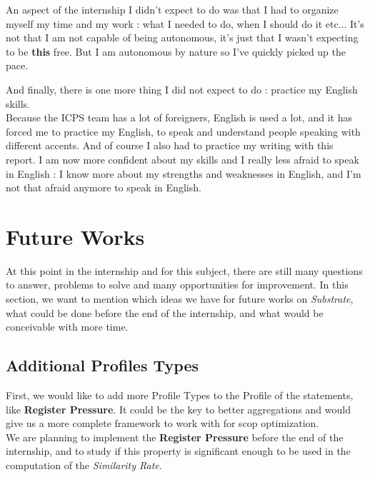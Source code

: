 \documentclass[paper=a4, fontsize=11.5pt]{scrartcl}
\numberwithin{equation}{section}        %
\numberwithin{figure}{section}          %
\numberwithin{table}{section}               %
\begin{document}
        An aspect of the internship I didn't expect to do was that I had to organize myself
        my time and my work : what I needed to do, when I should do it etc... It's not that I
        am not capable of being autonomous, it's just that I wasn't expecting to be
        \textbf{this} free. But I am autonomous by nature so I've quickly picked up the pace.

        And finally, there is one more thing I did not expect to do : practice my English skills.\\
        Because the ICPS team has a lot of foreigners, English is used a lot, and it has forced
        me to practice my English, to speak and understand people speaking with different accents.
        And of course I also had to practice my writing with this report.
        I am now more confident about my skills and I really less afraid to speak in English
        : I know more about my strengths and weaknesses in English, and I'm not that
        afraid anymore to speak in English.


\section{Future Works}
\label{sec:future_works}
At this point in the internship and for this subject, there are still many
questions to answer, problems to solve and many opportunities for improvement.
In this section, we want to mention which ideas we have for future works on \textit{Substrate},
what could be done before the end of the internship, and what would be conceivable with more time.
    \subsection{Additional Profiles Types}
        First, we would like to add more Profile Types to the Profile of the statements,
        like \textbf{Register Pressure}. It could be the key to better aggregations and would
        give us a more complete framework to work with for scop optimization.\\

        We are planning to implement the \textbf{Register Pressure} before the end of the
        internship, and to study if this property is significant enough to be used in the
        computation of the \textit{Similarity Rate}.
\end{document}
